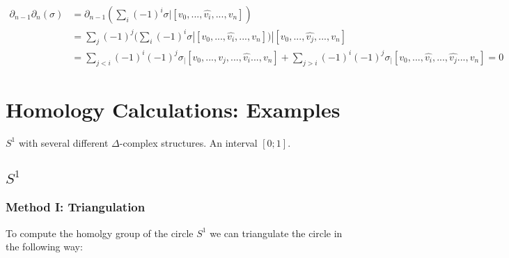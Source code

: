 \documentclass[11pt,a4paper]{report}
\begin{document}
            \begin{equation}
                \begin{aligned}
                    \partial_{n-1} \partial_n(\sigma) &=  \partial_{n-1}(\sum\limits_i (-1)^i \sigma | [v_0, ... ,\hat{v_i}, ... , v_n]) \\
                    &=  \sum\limits_j (-1)^j ( \sum\limits_i (-1)^i \sigma | [v_0, ... ,\hat{v_i}, ... , v_n]) | [v_0, ... ,\hat{v_j}, ... , v_n] \\
                    &=  \sum\limits_{j<i} (-1)^i(-1)^j  \sigma_ | [v_0, ... ,\hat{v_j},... ,\hat{v_i} ... , v_n] +
                    \sum\limits_{j>i} (-1)^i(-1)^{j}  \sigma_ | [v_0, ... ,\hat{v_i},... ,\hat{v_j} ... , v_n] = 0
                \end{aligned}
            \end{equation}
		 
		 \section{Homology Calculations: Examples}
		 
		 $S^1$ with several different $\Delta$-complex structures. An interval $[0;1]$.
		 
		 
              \subsection{$ S^1$}
                \subsubsection{Method I: Triangulation}
                To compute the homolgy group of the circle $S^1$ we can triangulate the circle in the following way: \\
                
\end{document}
